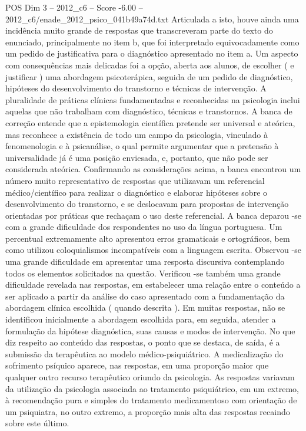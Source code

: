 \begin{textsample}{POS Dim 3 – 2012\_c6 – Score -6.00 – 2012\_c6/enade\_2012\_psico\_041b49a74d.txt}
Articulada a isto, houve ainda uma incidência muito grande de respostas que transcreveram parte do texto do enunciado, principalmente no item b, que foi interpretado equivocadamente como um pedido de justificativa para o diagnóstico apresentado no item a.
Um aspecto com consequências mais delicadas foi a opção, aberta aos alunos, de escolher ( e justificar ) uma abordagem psicoterápica, seguida de um pedido de diagnóstico, hipóteses do desenvolvimento do transtorno e técnicas de intervenção.
A pluralidade de práticas clínicas fundamentadas e reconhecidas na psicologia inclui aquelas que não trabalham com diagnóstico, técnicas e transtornos.
A banca de correção entende que a epistemologia científica pretende ser universal e ateórica, mas reconhece a existência de todo um campo da psicologia, vinculado à fenomenologia e à psicanálise, o qual permite argumentar que a pretensão à universalidade já é uma posição enviesada, e, portanto, que não pode ser considerada ateórica.
Confirmando as considerações acima, a banca encontrou um número muito representativo de respostas que utilizavam um referencial médico/científico para realizar o diagnóstico e elaborar hipóteses sobre o desenvolvimento do transtorno, e se deslocavam para propostas de intervenção orientadas por práticas que rechaçam o uso deste referencial.
A banca deparou -se com a grande dificuldade dos respondentes no uso da língua portuguesa.
Um percentual extremamente alto apresentou erros gramaticais e ortográficos, bem como utilizou coloquialismos incompatíveis com a linguagem escrita.
Observou -se uma grande dificuldade em apresentar uma resposta discursiva contemplando todos os elementos solicitados na questão.
Verificou -se também uma grande dificuldade revelada nas respostas, em estabelecer uma relação entre o conteúdo a ser aplicado a partir da análise do caso apresentado com a fundamentação da abordagem clínica escolhida ( quando descrita ).
Em muitas respostas, não se identificou inicialmente a abordagem escolhida para, em seguida, atender a formulação da hipótese diagnóstica, suas causas e modos de intervenção.
No que diz respeito ao conteúdo das respostas, o ponto que se destaca, de saída, é a submissão da terapêutica ao modelo médico-psiquiátrico.
A medicalização do sofrimento psíquico aparece, nas respostas, em uma proporção maior que qualquer outro recurso terapêutico oriundo da psicologia.
As respostas variavam da utilização da psicologia associada ao tratamento psiquiátrico, em um extremo, à recomendação pura e simples do tratamento medicamentoso com orientação de um psiquiatra, no outro extremo, a proporção mais alta das respostas recaindo sobre este último.

\end{textsample}
